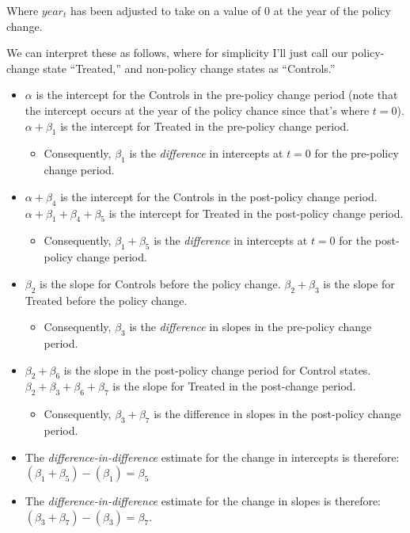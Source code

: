 \documentclass[12pt]{article}
\begin{document}
Where $year_{t}$ has been adjusted to take on a value of 0 at the year of the policy change.


We can interpret these as follows, where for simplicity I'll just call our policy-change state ``Treated,'' and non-policy change states as ``Controls.''

\begin{itemize}
  \item $\alpha$ is the intercept for the Controls in the pre-policy change period (note that the intercept occurs at the year of the policy chance since that's where $t=0$).
  $\alpha + \beta_{1}$ is the intercept for Treated in the pre-policy change period.
  \begin{itemize}
    \item Consequently, $\beta_1$ is the \emph{difference} in intercepts at $t=0$ for the pre-policy change period.
  \end{itemize}
  \item $\alpha + \beta_4$ is the intercept for the Controls in the post-policy change period. $\alpha + \beta_1 + \beta_4 + \beta_5$ is the intercept for Treated in the post-policy change period.
  \begin{itemize}
    \item Consequently, $\beta_1 + \beta_5$ is the \emph{difference} in intercepts at $t=0$ for the post-policy change period.
  \end{itemize}
  \item $\beta_2$ is the slope for Controls before the policy change. $\beta_2 + \beta_3$ is the slope for Treated before the policy change.
\begin{itemize}
  \item Consequently, $\beta_{3}$ is the \emph{difference} in slopes in the pre-policy change period.
\end{itemize}
  \item $\beta_{2} + \beta_{6}$ is the slope in the post-policy change period for Control states. $\beta_{2} + \beta_{3} + \beta_{6} + \beta_{7}$ is the slope for Treated in the post-change period.
  \begin{itemize}
    \item Consequently, $\beta_{3} + \beta_{7}$ is the difference in slopes in the post-policy change period.
  \end{itemize}
  \item The \emph{difference-in-difference} estimate for the change in intercepts is therefore: \\
   $(\beta_1 + \beta_5) - (\beta_1) = \beta_5$
  \item The \emph{difference-in-difference} estimate for the change in slopes is therefore:\\
   $(\beta_{3} + \beta_{7}) - (\beta_{3}) = \beta_7$.
\end{itemize}
\end{document}
